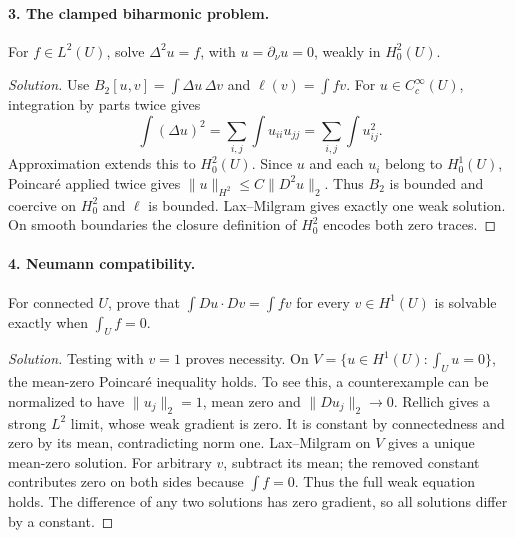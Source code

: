 \Needspace{30mm}
\paragraph{3. The clamped biharmonic problem.}
For $f\in L^2(U)$, solve
$\Delta^2u=f$, with $u=\partial_\nu u=0$, weakly in $H^2_0(U)$.
\begin{proof}[Solution]
Use $B_2[u,v]=\int\Delta u\,\Delta v$ and $\ell(v)=\int fv$.
For $u\in C^\infty_c(U)$, integration by parts twice gives
\[
 \int(\Delta u)^2=\sum_{i,j}\int u_{ii}u_{jj}
                  =\sum_{i,j}\int u_{ij}^2.
\]
Approximation extends this to $H^2_0(U)$.
Since $u$ and each $u_i$ belong to $H^1_0(U)$, Poincar\'e applied twice
gives $\|u\|_{H^2}\leq C\|D^2u\|_2$.
Thus $B_2$ is bounded and coercive on $H^2_0$ and $\ell$ is bounded.
Lax--Milgram gives exactly one weak solution. On smooth boundaries
the closure definition of $H^2_0$ encodes both zero traces.
\end{proof}
\Needspace{45mm}

\Needspace{30mm}
\paragraph{4. Neumann compatibility.}
For connected $U$, prove that
$\int Du\cdot Dv=\int fv$ for every $v\in H^1(U)$ is solvable exactly
when $\int_U f=0$.
\begin{proof}[Solution]
Testing with $v=1$ proves necessity. On
$V=\{u\in H^1(U):\int_Uu=0\}$, the mean-zero Poincar\'e inequality holds.
To see this, a counterexample can be normalized to have $\|u_j\|_2=1$,
mean zero and $\|Du_j\|_2\to0$.
Rellich gives a strong $L^2$ limit, whose weak gradient is zero.
It is constant by connectedness and zero by its mean, contradicting norm one.
Lax--Milgram on $V$ gives a unique mean-zero solution.
For arbitrary $v$, subtract its mean; the removed constant contributes
zero on both sides because $\int f=0$. Thus the full weak equation holds.
The difference of any two solutions has zero gradient, so all solutions
differ by a constant.
\end{proof}

\Needspace{30mm}
